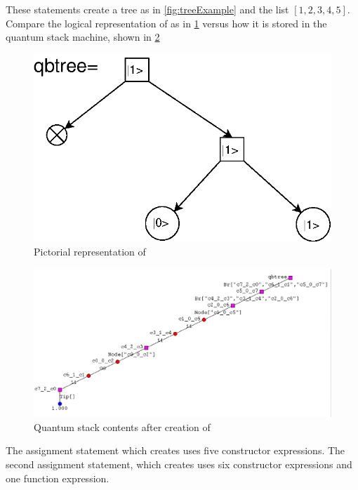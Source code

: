 These statements create a tree as in \vref{fig:treeExample} and 
the list $[1,2,3,4,5]$. Compare the logical representation of
 as in \ref{fig:treeExample} versus how it is stored
in the quantum stack machine, shown in \ref{fig:treeExampleInQS}
\begin{figure}[htbp]
\begin{center}
\includegraphics[scale=.6]{images/treeExample.eps}
\end{center}
\caption{Pictorial representation of }\label{fig:treeExample}
\end{figure}
\begin{figure}[htbp]
\begin{center}
\includegraphics[scale=.5]{images/treeExampleInQS.eps}
\end{center}
\caption{Quantum stack contents after creation of }\label{fig:treeExampleInQS}
\end{figure}
The assignment statement which creates  uses five constructor
expressions. The second assignment statement, which creates 
 uses six constructor expressions and one function expression.
